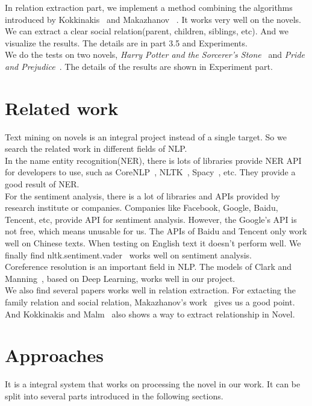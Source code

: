\documentclass[11pt]{article}
\begin{document}
In relation extraction part, we implement a method combining the algorithms introduced by Kokkinakis~\cite{kokkinakis-malm-2011-character} and Makazhanov ~\cite{Makazhanov2014ExtractingFR}. It works very well on the novels. We can extract a clear social relation(parent, children, siblings, etc). And we visualize the results. The details are in part 3.5 and Experiments. \\

We do the tests on two novels, \textit{Harry Potter and the Sorcerer's Stone}~\cite{harrypotter} and \textit{Pride and Prejudice}~\cite{pride}. The details of the results are shown in Experiment part.

\section{Related work} %
Text mining on novels is an integral project instead of a single target. So we search the related work in different fields of NLP.\\

In the name entity recognition(NER), there is lots of libraries provide NER API for developers to use, such as CoreNLP~\cite{corenlp}, NLTK~\cite{Loper02nltk:the}, Spacy~\cite{honnibal-johnson:2015:EMNLP}, etc. They provide a good result of NER.\\

For the sentiment analysis, there is a lot of libraries and APIs provided by research institute or companies. Companies like Facebook, Google, Baidu, Tencent, etc, provide API 
for sentiment analysis. However, the Google's API is not free, which means unusable for us. The APIs of Baidu and Tencent only work well on Chinese texts. When testing on English text it doesn't perform well. We finally find nltk.sentiment.vader~\cite{Vader} works well on sentiment analysis. \\

Coreference resolution is an important field in NLP. The models of Clark and Manning~\cite{clark-manning-2016-deep}, based on Deep Learning, works well in our project. \\

We also find several papers works well in relation extraction. For extacting the family relation and social relation, Makazhanov's work~\cite{Makazhanov2014ExtractingFR} gives us a good point. And Kokkinakis and Malm~\cite{kokkinakis-malm-2011-character} also shows a way to extract relationship in Novel.


\section{Approaches}
It is a integral system that works on processing the novel in our work. It can be split into several parts introduced in the following sections.
\end{document}
